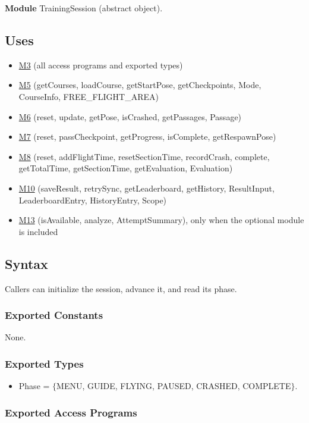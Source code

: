 \documentclass[12pt, titlepage]{article}
\newcommand{\Mref}[1]{\hyperref[sec:M#1]{M#1}}
\begin{document}
\textbf{Module} TrainingSession (abstract object).

\subsection{Uses}

\begin{itemize}
\item \Mref{3} (all access programs and exported types)
\item \Mref{5} (getCourses, loadCourse, getStartPose, getCheckpoints, Mode,
  CourseInfo, FREE\_FLIGHT\_AREA)
\item \Mref{6} (reset, update, getPose, isCrashed, getPassages, Passage)
\item \Mref{7} (reset, passCheckpoint, getProgress, isComplete,
  getRespawnPose)
\item \Mref{8} (reset, addFlightTime, resetSectionTime, recordCrash, complete,
  getTotalTime, getSectionTime, getEvaluation, Evaluation)
\item \Mref{10} (saveResult, retrySync, getLeaderboard, getHistory,
  ResultInput, LeaderboardEntry, HistoryEntry, Scope)
\item \Mref{13} (isAvailable, analyze, AttemptSummary), only when the optional
  module is included
\end{itemize}

\subsection{Syntax}

Callers can initialize the session, advance it, and read its phase.

\subsubsection{Exported Constants}

None.

\subsubsection{Exported Types}

\begin{itemize}
\item Phase = $\{$MENU, GUIDE, FLYING, PAUSED, CRASHED, COMPLETE$\}$.
\end{itemize}

\subsubsection{Exported Access Programs}
\end{document}
